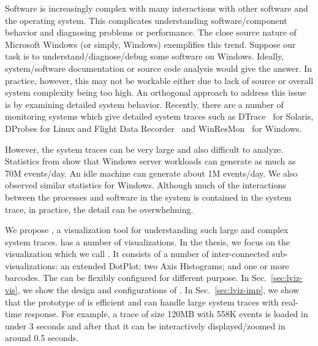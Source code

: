 
Software is increasingly complex with many interactions with other software
and the operating system.
This complicates understanding software/component behavior and diagnosing
problems or performance.
The close source nature of Microsoft Windows (or simply, Windows) exemplifies this trend.
Suppose our task is to understand/diagnose/debug some software on Windows.
Ideally, system/software documentation or source code
analysis would give the answer.
In practice, however, this may not be
workable either due to lack of source or overall
system complexity being too high.
An orthogonal approach to address this issue is by examining
detailed system behavior.
Recently, there are a number of monitoring systems which
give detailed system traces such as DTrace~\cite{cantrill2004dynamic} for Solaris,
DProbes for Linux and Flight Data Recorder~\cite{verbowski6flight}
and WinResMon~\cite{ramnath2006winresmon} for Windows.

However, the system traces can be very large and also
difficult to analyze. Statistics from \cite{verbowski6flight} show that Windows
server workloads can generate as much as 70M events/day.
An idle machine can generate about 1M events/day. We also
observed similar statistics for Windows. Although much of
the interactions between the processes and software in the
system is contained in the system trace, in practice, the detail
can be overwhelming.


We propose \lviz{}, a visualization tool for
understanding such large and complex system traces.
\lviz{} has a number of visualizations.
In the thesis, we focus on the visualization which we call \VDP{}.
It consists of a number of inter-connected sub-visualizations:
an extended DotPlot;
two Axis Histograms; and one or more barcodes.
The \VDP{} can be flexibly configured for different purpose.
In Sec.~\ref{sec:lviz-vis}, we show the design and configurations of \VDP{}.
In Sec.~\ref{sec:lviz-imp}, we show that
the prototype of \lviz{} is efficient and can handle large system traces
with real-time response. For example, a trace of size 120MB with 558K events 
is loaded in under 3 seconds
and after that it can be interactively displayed/zoomed in around 0.5 seconds.

